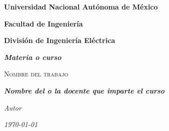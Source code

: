 \documentclass[11pt]{article} %
\begin{document}
    

    \begin{figure}
        \hfill
    \end{figure}
    

    \vspace{1cm}

    \begin{titlepage}                     
        \centering
        {\bfseries\LARGE Universidad Nacional Aut\'onoma de M\'exico \par}
        \vspace{1cm}
        {\bfseries\LARGE Facultad de Ingenier\'ia \par}
        \vspace{1cm}
        {\bfseries\LARGE Divisi\'on de Ingenier\'ia El\'ectrica\par}
        \vspace{1cm}
        {\itshape\Large \textbf{Materia o curso\\} \par} 
        \vspace{1cm}
        {\scshape\Huge{Nombre del trabajo\\} \par}
        \vspace{1cm}
        {\itshape\Large \textbf{Nombre del o la docente que imparte el curso\\} \par}
        \vspace{1cm}
        \vfill
        {\itshape\Large Autor \\\par}
        \vfill
        \vspace{1cm}
        {\itshape\Large \today\par}   
    \end{titlepage}
	
\end{document}
